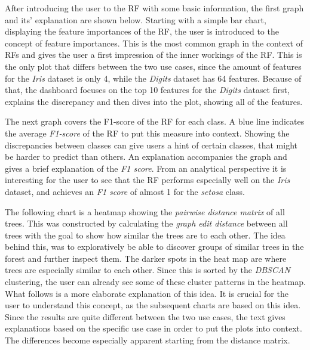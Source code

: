 \documentclass[a4paper, 12pt]{article}
\begin{document}
After introducing the user to the RF with some basic information, the first graph and its' explanation
are shown below. Starting with a simple bar chart, displaying the feature importances of the RF,
the user is introduced to the concept of feature importances. This is the most common graph in the
context of RFs and gives the user a first impression of the inner workings of the RF. This is the only
plot that differs between the two use cases, since the amount of features for the \textit{Iris} dataset
is only 4, while the \textit{Digits} dataset has 64 features. Because of that, the dashboard focuses on the
top 10 features for the \textit{Digits} dataset first, explains the discrepancy and then dives into the
plot, showing all of the features. \par

The next graph covers the F1-score of the RF for each class. A blue line indicates the average
\textit{F1-score} of the RF to put this measure into context. Showing the discrepancies between classes can
give users a hint of certain classes, that might be harder to predict than others. An explanation accompanies
the graph and gives a brief explanation of the \textit{F1 score}.
From an analytical perspective it is interesting for the user to see that the RF performs especially well on
the \textit{Iris} dataset, and achieves an \textit{F1 score} of almost 1 for the \textit{setosa} class. \par

The following chart is a heatmap showing the \textit{pairwise distance matrix} of all trees.
This was constructed by calculating the \textit{graph edit distance} between all trees with the goal to show
how similar the trees are to each other. The idea behind this, was to exploratively be able to discover
groups of similar trees in the forest and further inspect them. The darker spots in the heat map are
where trees are especially similar to each other. Since this is sorted by the \textit{DBSCAN} clustering,
the user can already see some of these cluster patterns in the heatmap. What follows is a more
elaborate explanation of this idea. It is crucial for the user to understand this concept, as the
subsequent charts are based on this idea. Since the results are quite different between the two use
cases, the text gives explanations based on the specific use case in order to put the plots into context.
The differences become especially apparent starting from the distance matrix. \par
\end{document}
